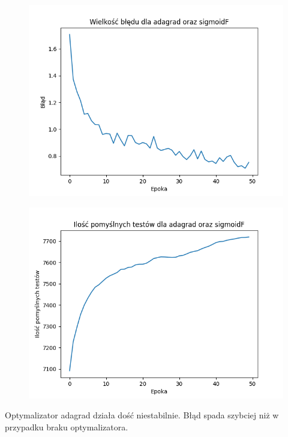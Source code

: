 \documentclass{article}
\begin{document}
\begin{figure}[!htb]
  \centering
  \includegraphics[width=\linewidth]{error_adagrad_sigmoidF.png}
\end{figure}

\begin{figure}[!htb]
  \centering
  \includegraphics[width=\linewidth]{test_adagrad_sigmoidF.png}
\end{figure}

Optymalizator adagrad działa dość niestabilnie. Błąd spada szybciej niż w przypadku braku optymalizatora.
\end{document}
